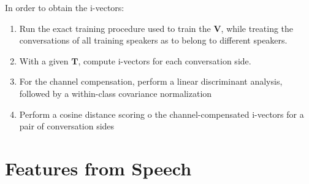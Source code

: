 In order to obtain the i-vectors:
\begin{enumerate}
    \item Run the exact training procedure used to train the $\bm{V}$, while treating the conversations of all training speakers as to belong to different speakers. 
    \item With a given $\bm{T}$, compute i-vectors for each conversation side.
    \item For the channel compensation, perform a linear discriminant analysis, followed by a within-class covariance normalization
    \item Perform a cosine distance scoring o the channel-compensated i-vectors for a pair of conversation sides
\end{enumerate}

\section{Features from Speech}
